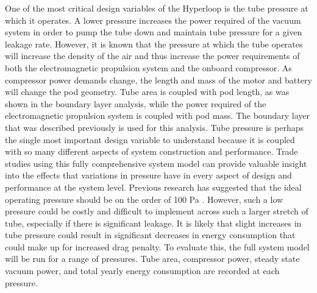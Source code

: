 One of the most critical design variables of the Hyperloop is the tube pressure
at which it operates. A lower pressure increases the power required of the
vacuum system in order to pump the tube down and maintain tube pressure for a
given leakage rate. However, it is known that the pressure at which the tube
operates will increase the density of the air and thus increase the power
requirements of both the electromagnetic propulsion system and the onboard compressor.
As compressor power demands change, the length and mass of the motor and
battery will change the pod geometry. Tube area is coupled with pod length,
as was shown in the boundary layer analysis, while the power required of the
electromagnetic propulsion system is coupled with pod mass. The boundary layer
that was described previously is used for this analysis. Tube pressure is
perhaps the single most important design variable to understand because it is
coupled with so many different aspects of system construction and performance.
Trade studies using this fully comprehensive system model can provide valuable
insight into the effects that variations in pressure have in every aspect of
design and performance at the system level.
Previous research has suggested that the ideal operating pressure should be on
the order of 100 Pa \cite{Musk, Chin}. However, such a low pressure could be
costly and difficult to implement across such a larger stretch of tube,
especially if there is significant leakage. It is likely that slight increases
in tube pressure could result in significant decreases in energy consumption
that could make up for increased drag penalty. To evaluate this, the full
system model will be run for a range of pressures. Tube area, compressor power,
steady state vacuum power, and total yearly energy consumption are recorded at each pressure.

